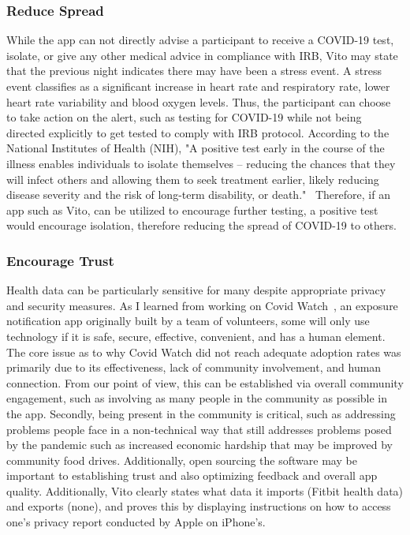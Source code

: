 \documentclass{article}
\begin{document}
\subsubsection{Reduce Spread}
While the app can not directly advise a participant to receive a COVID-19 test, isolate, or give any other medical advice in compliance with IRB, Vito may state that the previous night indicates there may have been a stress event.  A stress event classifies as a significant increase in heart rate and respiratory rate, lower heart rate variability and blood oxygen levels.  Thus, the participant can choose to take action on the alert, such as testing for COVID-19 while not being directed explicitly to get tested to comply with IRB protocol. According to the National Institutes of Health (NIH), "A positive test early in the course of the illness enables individuals to isolate themselves – reducing the chances that they will infect others and allowing them to seek treatment earlier, likely reducing disease severity and the risk of long-term disability, or death."~\cite{nih}  
Therefore, if an app such as Vito, can be utilized to encourage further testing, a positive test would encourage isolation, therefore reducing the spread of COVID-19 to others.

\subsubsection{Encourage Trust}
Health data can be particularly sensitive for many despite appropriate privacy and security measures.  As I learned from working on Covid Watch~\cite{covidwatch}, an exposure notification app originally built by a team of volunteers, some will only use technology if it is safe, secure, effective, convenient, and has a human element.  The core issue as to why Covid Watch did not reach adequate adoption rates was primarily due to its effectiveness, lack of community involvement, and human connection.  
From our point of view, this can be established via overall community engagement, such as involving as many people in the community as possible in the app.  Secondly, being present in the community is critical, such as addressing problems people face in a non-technical way that still addresses problems posed by the pandemic such as increased economic hardship that may be improved by community food drives.  Additionally, open sourcing the software may be important to establishing trust and also optimizing feedback and overall app quality.  Additionally, Vito clearly states what data it imports (Fitbit health data) and exports (none), and proves this by displaying instructions on how to access one's privacy report conducted by Apple on iPhone's.
\end{document}
